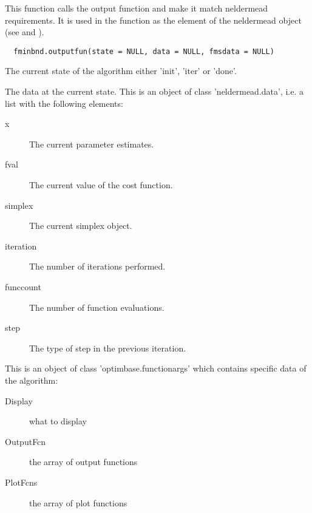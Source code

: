 %
\begin{Description}\relax
This function calls the output function and make it match neldermead
requirements. It is used in the  function as the
 element of the neldermead object (see
 and ).
\end{Description}
%
\begin{Usage}
\begin{verbatim}
  fminbnd.outputfun(state = NULL, data = NULL, fmsdata = NULL)
\end{verbatim}
\end{Usage}
%
\begin{Arguments}
\begin{ldescription}
\item[\code{state}] The current state of the algorithm either 'init', 'iter' or
'done'.
\item[\code{data}] The data at the current state. This is an object of class 
'neldermead.data', i.e. a list with the following elements: \begin{description}

\item[x] The current parameter estimates.
\item[fval] The current value of the cost function.
\item[simplex] The current simplex object.
\item[iteration] The number of iterations performed.
\item[funccount] The number of function evaluations.
\item[step] The type of step in the previous iteration.

\end{description}


\item[\code{fmsdata}] This is an object of class 'optimbase.functionargs' which 
contains specific data of the  algorithm: \begin{description}

\item[Display] what to display
\item[OutputFcn] the array of output functions
\item[PlotFcns] the array of plot functions

\end{description}


\end{ldescription}
\end{Arguments}
